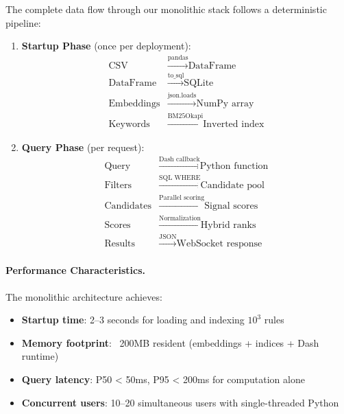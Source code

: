 The complete data flow through our monolithic stack follows a deterministic pipeline:

\begin{enumerate}[leftmargin=*,itemsep=2pt,topsep=2pt]
 \item \textbf{Startup Phase} (once per deployment):
   \begin{align}
   \text{CSV} &\xrightarrow{\text{pandas}} \text{DataFrame} \\
   \text{DataFrame} &\xrightarrow{\text{to\_sql}} \text{SQLite} \\
   \text{Embeddings} &\xrightarrow{\text{json.loads}} \text{NumPy array} \\
   \text{Keywords} &\xrightarrow{\text{BM25Okapi}} \text{Inverted index}
   \end{align}
 
 \item \textbf{Query Phase} (per request):
   \begin{align}
   \text{Query} &\xrightarrow{\text{Dash callback}} \text{Python function} \\
   \text{Filters} &\xrightarrow{\text{SQL WHERE}} \text{Candidate pool} \\
   \text{Candidates} &\xrightarrow{\text{Parallel scoring}} \text{Signal scores} \\
   \text{Scores} &\xrightarrow{\text{Normalization}} \text{Hybrid ranks} \\
   \text{Results} &\xrightarrow{\text{JSON}} \text{WebSocket response}
   \end{align}
\end{enumerate}

\paragraph{Performance Characteristics.} The monolithic architecture achieves:
\begin{itemize}[leftmargin=*,itemsep=2pt,topsep=2pt]
 \item \textbf{Startup time}: 2--3 seconds for loading and indexing $10^3$ rules
 \item \textbf{Memory footprint}: ~200MB resident (embeddings + indices + Dash runtime)
 \item \textbf{Query latency}: P50 < 50ms, P95 < 200ms for computation alone
 \item \textbf{Concurrent users}: 10--20 simultaneous users with single-threaded Python
\end{itemize}

